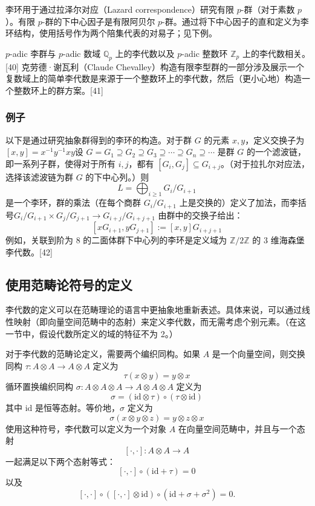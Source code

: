 李环用于通过拉泽尔对应（Lazard correspondence）研究有限 \( p \)-群（对于素数 \( p \)）。有限 \( p \)-群的下中心因子是有限阿贝尔 \( p \)-群。通过将下中心因子的直和定义为李环结构，使用括号作为两个陪集代表的对易子；见下例。

\( p \)-adic 李群与 \( p \)-adic 数域 \( \mathbb{Q}_p \) 上的李代数以及 \( p \)-adic 整数环 \( \mathbb{Z}_p \) 上的李代数相关。[40] 克劳德·谢瓦利（Claude Chevalley）构造有限李型群的一部分涉及展示一个复数域上的简单李代数是来源于一个整数环上的李代数，然后（更小心地）构造一个整数环上的群方案。[41]
\subsubsection{例子}
以下是通过研究抽象群得到的李环的构造。对于群 \( G \) 的元素 \( x, y \)，定义交换子为\([x,y] = x^{-1}y^{-1}xy\)设 \( G = G_1 \supseteq G_2 \supseteq G_3 \supseteq \cdots \supseteq G_n \supseteq \cdots \) 是群 \( G \) 的一个滤波链，即一系列子群，使得对于所有 \( i, j \)，都有 \( [G_i, G_j] \subseteq G_{i+j} \)。（对于拉扎尔对应法，选择该滤波链为群 \( G \) 的下中心列。）则
\[
L = \bigoplus_{i \geq 1} G_i / G_{i+1}~
\]
是一个李环，群的乘法（在每个商群 \( G_i / G_{i+1} \) 上是交换的）定义了加法，而李括号\(G_i / G_{i+1} \times G_j / G_{j+1} \to G_{i+j} / G_{i+j+1}\)
由群中的交换子给出：
\[
[xG_{i+1}, yG_{j+1}] := [x,y] G_{i+j+1}~
\]
例如，关联到阶为 8 的二面体群下中心列的李环是定义域为 \( \mathbb{Z}/2\mathbb{Z} \) 的 3 维海森堡李代数。[42]
\subsection{使用范畴论符号的定义}
李代数的定义可以在范畴理论的语言中更抽象地重新表述。具体来说，可以通过线性映射（即向量空间范畴中的态射）来定义李代数，而无需考虑个别元素。（在这一节中，假设代数所定义的域的特征不为 2。）

对于李代数的范畴论定义，需要两个编织同构。如果 \( A \) 是一个向量空间，则交换同构 \( \tau: A \otimes A \to A \otimes A \) 定义为
\[
\tau(x \otimes y) = y \otimes x~
\]
循环置换编织同构 \( \sigma : A \otimes A \otimes A \to A \otimes A \otimes A \) 定义为
\[
\sigma = (\mathrm{id} \otimes \tau) \circ (\tau \otimes \mathrm{id})~
\]
其中 \( \mathrm{id} \) 是恒等态射。等价地，\( \sigma \) 定义为
\[
\sigma(x \otimes y \otimes z) = y \otimes z \otimes x~
\]
使用这种符号，李代数可以定义为一个对象 \( A \) 在向量空间范畴中，并且与一个态射
\[
[\cdot , \cdot] : A \otimes A \to A~
\]
一起满足以下两个态射等式：
\[
[\cdot , \cdot] \circ (\mathrm{id} + \tau) = 0~
\]
以及
\[
[\cdot , \cdot] \circ ([\cdot , \cdot] \otimes \mathrm{id}) \circ (\mathrm{id} + \sigma + \sigma^2) = 0.~
\]
